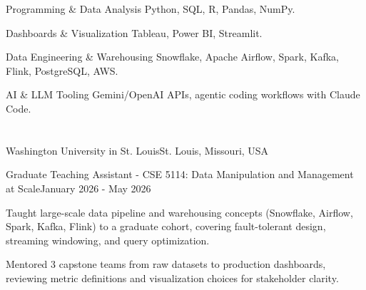 \documentclass[10pt, letterpaper]{article}
\begin{document}
\vspace{\entrySpacing}
\begin{skillcategory}{Programming \& Data Analysis}
	Python, SQL, R, Pandas, NumPy.
\end{skillcategory}

\vspace{\entrySpacing}
\begin{skillcategory}{Dashboards \& Visualization}
	Tableau, Power BI, Streamlit.
\end{skillcategory}

\vspace{\entrySpacing}
\begin{skillcategory}{Data Engineering \& Warehousing}
	Snowflake, Apache Airflow, Spark, Kafka, Flink, PostgreSQL, AWS.
\end{skillcategory}

\vspace{\entrySpacing}
\begin{skillcategory}{AI \& LLM Tooling}
	Gemini/OpenAI APIs, agentic coding workflows with Claude Code.
\end{skillcategory}

\vspace{\headerSpacing}


\section{}

\vspace{\entrySpacing}
\begin{leadershipentry}{Washington University in St. Louis}{St. Louis, Missouri, USA}
	\begin{positionentry}{Graduate Teaching Assistant - CSE 5114: Data Manipulation and Management at Scale}{January 2026 - May 2026}
		\item Taught large-scale data pipeline and warehousing concepts (Snowflake, Airflow, Spark, Kafka, Flink) to a graduate cohort, covering fault-tolerant design, streaming windowing, and query optimization.
		\item Mentored 3 capstone teams from raw datasets to production dashboards, reviewing metric definitions and visualization choices for stakeholder clarity.
	\end{positionentry}
\end{leadershipentry}
\end{document}
